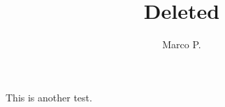 \documentclass[DIV=9,fontsize=10pt,oneside,paper=a5]{scrartcl}
\title{Deleted}
\date{}
\author{Marco P.}
\begin{document}
\maketitle




This is another test.



\cleardoublepage

\thispagestyle{empty}
\strut
\vfill

\begin{center}





\end{center}
\end{document}
